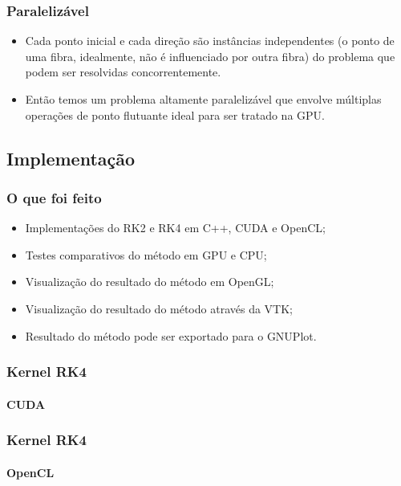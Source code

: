 \documentclass[brazil, 10pt]{beamer}
\begin{document}
\begin{frame}
  \frametitle{Paralelizável}
  
  \begin{itemize}
    \item Cada ponto inicial e cada direção são instâncias independentes (o ponto de uma fibra, idealmente, não é influenciado por outra fibra) do problema que podem ser resolvidas concorrentemente.
    \item Então temos um problema altamente paralelizável que envolve múltiplas operações de ponto flutuante ideal para ser tratado na GPU.
  \end{itemize}
\end{frame}

\subsection{Implementação}
\begin{frame}
  \frametitle{O que foi feito}

  \begin{itemize}
    \item Implementações do RK2 e RK4 em C++, CUDA e OpenCL;
    \item Testes comparativos do método em GPU e CPU;
    \item Visualização do resultado do método em OpenGL;
    \item Visualização do resultado do método através da VTK;
    \item Resultado do método pode ser exportado para o GNUPlot.
  \end{itemize}
\end{frame}

\begin{frame}
  \frametitle{Kernel RK4}
  \framesubtitle{CUDA}
  
  
\end{frame}

\begin{frame}
  \frametitle{Kernel RK4}
  \framesubtitle{OpenCL}
  
  
\end{frame}
\end{document}
